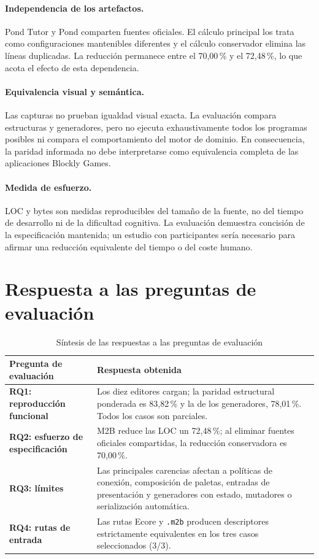 \paragraph{Independencia de los artefactos.}
Pond Tutor y Pond comparten fuentes oficiales. El cálculo principal los trata
como configuraciones mantenibles diferentes y el cálculo conservador elimina
las líneas duplicadas. La reducción permanece entre el 70,00\,\% y el
72,48\,\%, lo que acota el efecto de esta dependencia.

\paragraph{Equivalencia visual y semántica.}
Las capturas no prueban igualdad visual exacta. La evaluación compara
estructuras y generadores, pero no ejecuta exhaustivamente todos los programas
posibles ni compara el comportamiento del motor de dominio. En consecuencia,
la paridad informada no debe interpretarse como equivalencia completa de las
aplicaciones Blockly Games.

\paragraph{Medida de esfuerzo.}
LOC y bytes son medidas reproducibles del tamaño de la fuente, no del tiempo de
desarrollo ni de la dificultad cognitiva. La evaluación demuestra concisión de
la especificación mantenida; un estudio con participantes sería necesario para
afirmar una reducción equivalente del tiempo o del coste humano.

\section{Respuesta a las preguntas de evaluación}
\label{sec:respuesta-rq}

\begin{table}[htbp]
  \centering
  \caption{Síntesis de las respuestas a las preguntas de evaluación}
  \label{tab:respuesta-rq}
  \footnotesize
  \begin{tabular}{L{0.24\textwidth}L{0.68\textwidth}}
    \toprule
    Pregunta de evaluación & Respuesta obtenida \\
    \midrule
    \textbf{RQ1: reproducción funcional} & Los diez editores cargan; la paridad estructural ponderada es 83,82\,\% y la de los generadores, 78,01\,\%. Todos los casos son parciales. \\
    \textbf{RQ2: esfuerzo de especificación} & M2B reduce las LOC un 72,48\,\%; al eliminar fuentes oficiales compartidas, la reducción conservadora es 70,00\,\%. \\
    \textbf{RQ3: límites} & Las principales carencias afectan a políticas de conexión, composición de paletas, entradas de presentación y generadores con estado, mutadores o serialización automática. \\
    \textbf{RQ4: rutas de entrada} & Las rutas Ecore y \texttt{.m2b} producen descriptores estrictamente equivalentes en los tres casos seleccionados (3/3). \\
    \bottomrule
  \end{tabular}
\end{table}

